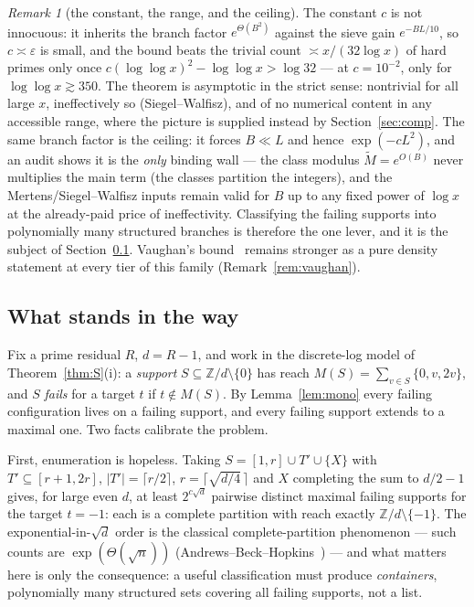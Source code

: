 \documentclass[11pt]{article}
\theoremstyle{plain}
\theoremstyle{remark}
\newtheorem{remark}[theorem]{Remark}
\theoremstyle{plain}
\numberwithin{equation}{section}
\begin{document}
\begin{remark}[the constant, the range, and the
ceiling]\label{rem:ceiling}
The constant $c$ is not innocuous: it inherits the branch factor
$e^{\Theta(B^2)}$ against the sieve gain $e^{-BL/10}$, so
$c \asymp \varepsilon$ is small, and the bound beats the trivial count
$\asymp x/(32\log x)$ of hard primes only once
$c(\log\log x)^2 - \log\log x > \log 32$ --- at $c = 10^{-2}$, only
for $\log\log x \gtrsim 350$. The theorem is asymptotic in the strict
sense: nontrivial for all large $x$, ineffectively so
(Siegel--Walfisz), and of no numerical content in any accessible
range, where the picture is supplied instead by
Section~\ref{sec:comp}. The same branch factor is the ceiling: it
forces $B \ll L$ and hence $\exp(-cL^2)$, and an audit shows it is the
\emph{only} binding wall --- the class modulus $\widetilde M = e^{O(B)}$
never multiplies the main term (the classes partition the integers),
and the Mertens/Siegel--Walfisz inputs remain valid for $B$ up to any
fixed power of $\log x$ at the already-paid price of ineffectivity.
Classifying the failing supports into polynomially many structured
branches is therefore the one lever, and it is the subject of
Section~\ref{sec:branch}. Vaughan's bound~\cite{Vaughan} remains
stronger as a pure density statement at every tier of this family
(Remark~\ref{rem:vaughan}).
\end{remark}

\subsection{What stands in the way}\label{sec:branch}

Fix a prime residual $R$, $d = R - 1$, and work in the discrete-log
model of Theorem~\ref{thm:S}(i): a \emph{support}
$S \subseteq \mathbb{Z}/d \setminus \{0\}$ has reach
$M(S) = \sum_{v \in S} \{0, v, 2v\}$, and $S$ \emph{fails} for a target
$t$ if $t \notin M(S)$. By Lemma~\ref{lem:mono} every failing
configuration lives on a failing support, and every failing support
extends to a maximal one. Two facts calibrate the problem.

First, enumeration is hopeless. Taking
$S = [1, r] \cup T' \cup \{X\}$ with $T' \subseteq [r+1, 2r]$,
$|T'| = \lceil r/2\rceil$, $r = \lceil\sqrt{d/4}\,\rceil$ and $X$
completing the sum to $d/2 - 1$ gives, for large even $d$, at least
$2^{c\sqrt d}$ pairwise distinct maximal failing supports for the
target $t = -1$: each is a complete partition with reach exactly
$\mathbb{Z}/d \setminus \{-1\}$. The exponential-in-$\sqrt d$ order is
the classical complete-partition phenomenon --- such counts are
$\exp(\Theta(\sqrt n))$ (Andrews--Beck--Hopkins~\cite{ABH}) --- and
what matters here is only the consequence: a useful classification must
produce \emph{containers}, polynomially many structured sets covering
all failing supports, not a list.
\end{document}
